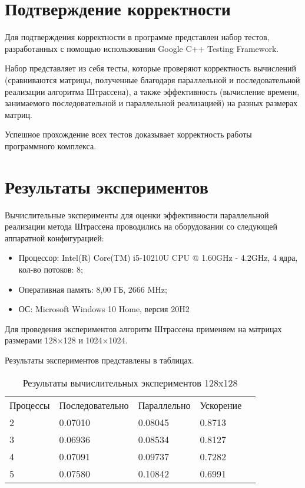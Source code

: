 \documentclass{report}
\begin{document}
\section*{Подтверждение корректности}
Для подтверждения корректности в программе представлен набор тестов, разработанных с помощью использования Google C++ Testing Framework.
\par Набор представляет из себя тесты, которые проверяют корректность вычислений (сравниваются матрицы, полученные благодаря параллельной и последовательной реализации алгоритма Штрассена), а также эффективность (вычисление времени, занимаемого последовательной и параллельной реализацией) на разных размерах матриц.
\par Успешное прохождение всех тестов доказывает корректность работы программного комплекса.
\newpage

\section*{Результаты экспериментов}
Вычислительные эксперименты для оценки эффективности параллельной реализации метода Штрассена проводились на оборудовании со следующей аппаратной конфигурацией:

\begin{itemize}
\item Процессор: Intel(R) Core(TM) i5-10210U CPU @ 1.60GHz - 4.2GHz, 4 ядра, кол-во потоков: 8;
\item Оперативная память: 8,00 ГБ, 2666 MHz;
\item ОС: Microsoft Windows 10 Home, версия 20H2
\end{itemize}

\par Для проведения экспериментов алгоритм Штрассена применяем на матрицах размерами 128$\times$128 и 1024$\times$1024.
\par Результаты экспериментов представлены в таблицах.

\begin{table}[!h]
\caption{Результаты вычислительных экспериментов 128x128}
\centering
\begin{tabular}{lllll}
Процессы & Последовательно & Параллельно & Ускорение   \\
2        & 0.07010         & 0.08045     & 0.8713        \\
3        & 0.06936         & 0.08534     & 0.8127       \\
4        & 0.07091         & 0.09737     & 0.7282       \\
5        & 0.07580         & 0.10842     & 0.6991       \\
\end{tabular}
\end{table}
\end{document}
